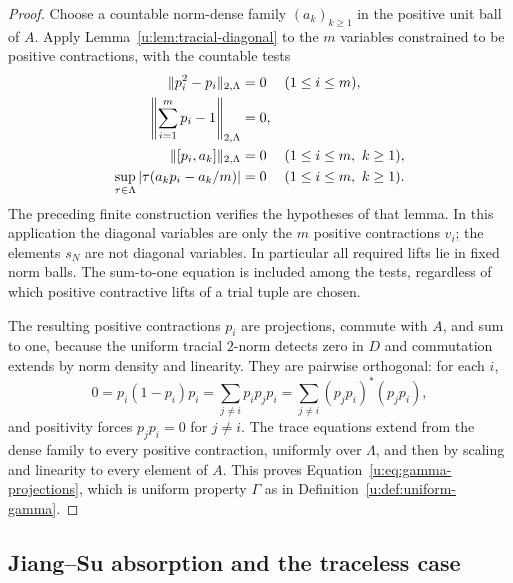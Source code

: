 \begin{proof}
Choose a countable norm-dense family $(a_k)_{k\geq1}$ in the positive
unit ball of $A$.  Apply Lemma~\ref{u:lem:tracial-diagonal} to the
$m$ variables constrained to be positive contractions, with the
countable tests
\begin{align*}
  \norm{p_i^2-p_i}_{2,\Lambda}&=0
       &&(1\leq i\leq m),\\
  \norm*{\sum_{i=1}^m p_i-1}_{2,\Lambda}&=0,\\
  \norm{[p_i,a_k]}_{2,\Lambda}&=0
       &&(1\leq i\leq m,\ k\geq1),\\
  \sup_{\tau\in\Lambda}
       |\tau(a_kp_i-a_k/m)|&=0
       &&(1\leq i\leq m,\ k\geq1).
\end{align*}
The preceding finite construction verifies the hypotheses of that
lemma.  In this application the diagonal variables are only the
$m$ positive contractions $v_i$; the elements $s_N$ are not diagonal
variables.  In particular all required lifts lie in fixed norm balls.
The sum-to-one equation is included among the tests, regardless of
which positive contractive lifts of a trial tuple are chosen.

The resulting positive contractions $p_i$ are projections, commute
with $A$, and sum to one, because the uniform tracial $2$-norm
detects zero in $D$ and commutation extends by norm density and
linearity.  They are pairwise orthogonal: for each $i$,
\[
  0=p_i(1-p_i)p_i
    =\sum_{j\ne i}p_ip_jp_i
    =\sum_{j\ne i}(p_jp_i)^*(p_jp_i),
\]
and positivity forces $p_jp_i=0$ for $j\ne i$.  The trace equations
extend from the dense family to every positive contraction, uniformly
over $\Lambda$, and then by scaling and linearity to every element
of $A$.  This proves Equation~\eqref{u:eq:gamma-projections}, which is
uniform property $\Gamma$ as in Definition~\ref{u:def:uniform-gamma}.
\end{proof}

\subsection{Jiang--Su absorption and the traceless case}

